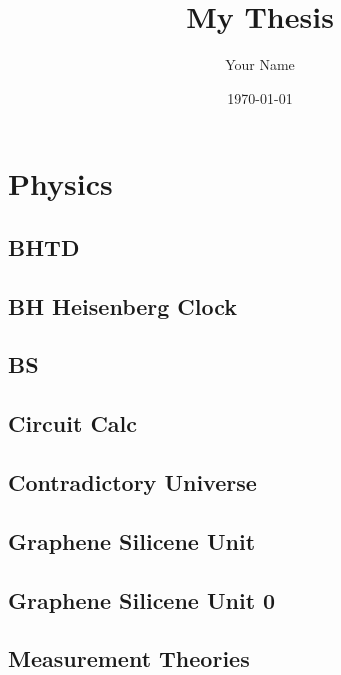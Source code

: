 \documentclass{report}
\title{My Thesis}
\author{Your Name}
\date{\today}
\begin{document}
\maketitle

\tableofcontents

\part{Physics}

\chapter{BHTD}


\chapter{BH Heisenberg Clock}


\chapter{BS}


\chapter{Circuit Calc}


\chapter{Contradictory Universe}


\chapter{Graphene Silicene Unit}


\chapter{Graphene Silicene Unit 0}


\chapter{Measurement Theories}

\end{document}
